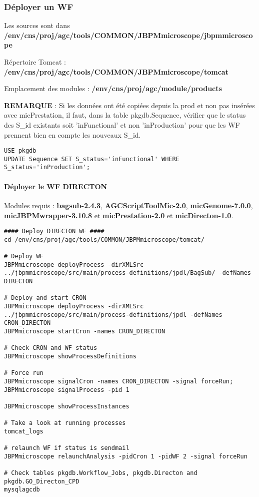 \subsubsection{Déployer un WF}
Les sources sont dans \textbf{/env/cns/proj/agc/tools/COMMON/JBPMmicroscope/jbpmmicroscope}
\newline

Répertoire Tomcat : \textbf{/env/cns/proj/agc/tools/COMMON/JBPMmicroscope/tomcat}
\newline

Emplacement des modules : \textbf{/env/cns/proj/agc/module/products}
\newline

\begin{mycolorbox}\textbf{REMARQUE}  : Si les données ont été copiées depuis la prod et non pas insérées avec micPrestation, il faut, dans la table pkgdb.Sequence, vérifier que le status des S\_id existants soit 'inFunctional' et non 'inProduction' pour que les WF prennent bien en compte les nouveaux S\_id.
\end{mycolorbox}
\begin{lstlisting}[style=SQL]
USE pkgdb
UPDATE Sequence SET S_status='inFunctional' WHERE S_status='inProduction';
\end{lstlisting}

\paragraph{Déployer le WF DIRECTON}
Modules requis : \textbf{bagsub-2.4.3}, \textbf{AGCScriptToolMic-2.0}, \textbf{micGenome-7.0.0}, \textbf{micJBPMwrapper-3.10.8} et \textbf{micPrestation-2.0} et \textbf{micDirecton-1.0}.

\begin{lstlisting}[style=bash]
#### Deploy DIRECTON WF ####
cd /env/cns/proj/agc/tools/COMMON/JBPMmicroscope/tomcat/

# Deploy WF
JBPMmicroscope deployProcess -dirXMLSrc ../jbpmmicroscope/src/main/process-definitions/jpdl/BagSub/ -defNames DIRECTON

# Deploy and start CRON
JBPMmicroscope deployProcess -dirXMLSrc ../jbpmmicroscope/src/main/process-definitions/jpdl -defNames CRON_DIRECTON
JBPMmicroscope startCron -names CRON_DIRECTON

# Check CRON and WF status
JBPMmicroscope showProcessDefinitions

# Force run
JBPMmicroscope signalCron -names CRON_DIRECTON -signal forceRun; JBPMmicroscope signalProcess -pid 1

JBPMmicroscope showProcessInstances

# Take a look at running processes
tomcat_logs

# relaunch WF if status is sendmail
JBPMmicroscope relaunchAnalysis -pidCron 1 -pidWF 2 -signal forceRun

# Check tables pkgdb.Workflow_Jobs, pkgdb.Directon and pkgdb.GO_Directon_CPD
mysqlagcdb
\end{lstlisting}